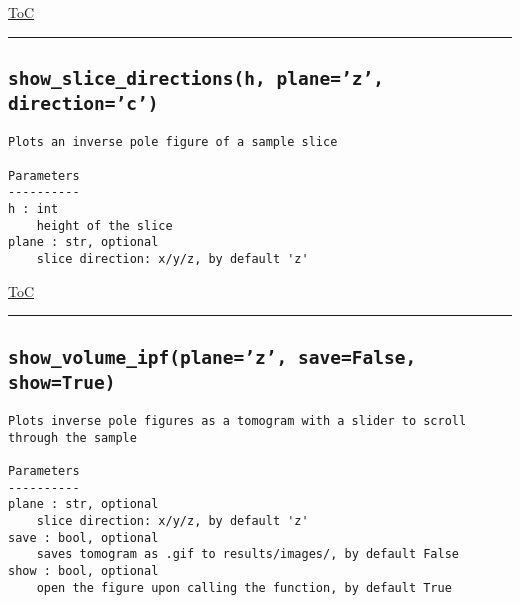\documentclass{article}
\begin{document}
\begin{flushright}

\hyperref[toc]{ToC}

\end{flushright}



\vspace{5mm}

\hrule

\subsection*{\texttt{show\_slice\_directions(h, plane='z', direction='c')}}
\label{fun:showslicedirections}

\begin{lstlisting}[language=docstring]
Plots an inverse pole figure of a sample slice

Parameters
----------
h : int
    height of the slice
plane : str, optional
    slice direction: x/y/z, by default 'z'
\end{lstlisting}

\begin{flushright}

\hyperref[toc]{ToC}

\end{flushright}



\vspace{5mm}

\hrule

\subsection*{\texttt{show\_volume\_ipf(plane='z', save=False, show=True)}}
\label{fun:showvolumeipf}

\begin{lstlisting}[language=docstring]
Plots inverse pole figures as a tomogram with a slider to scroll through the sample

Parameters
----------
plane : str, optional
    slice direction: x/y/z, by default 'z'
save : bool, optional
    saves tomogram as .gif to results/images/, by default False
show : bool, optional
    open the figure upon calling the function, by default True
\end{lstlisting}
\end{document}
